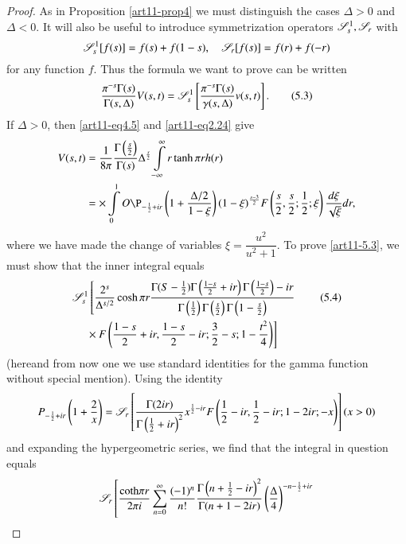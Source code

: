 \begin{proof}
As in Proposition \eqref{art11-prop4} we must distinguish the cases $\Delta > 0$ and $\Delta < 0$. It will also be useful  to introduce symmetrization operators $\mathscr{S}^1_s, \mathscr{S}_r$ with 
$$
\mathscr{S}^1_s [f(s)] = f(s) + f (1-s), \quad \mathscr{S}_r [f(s)] = f(r) + f (-r)
$$
for any function $f$. Thus the formula we want to prove can be written 
\begin{equation*}
\frac{\pi^{-s} \Gamma (s)}{\Gamma (s, \Delta)} V (s,t) = \mathscr{S}^1_s \left[\frac{\pi^{-s} \Gamma (s)}{\gamma (s, \Delta)} v (s,t) \right].
\tag{5.3}\label{art11-eq5.3}
\end{equation*}
If $\Delta >0$, then \eqref{art11-eq4.5} and \eqref{art11-eq2.24} give 
\begin{align*}
V(s,t) & =\frac{1}{8\pi} \frac{\Gamma \left(\frac{s}{2} \right)}{\Gamma (s)} \Delta^{\frac{s}{2}} \int\limits^\infty_{-\infty} r \tanh \pi r h (r)\\
& =\times \int\limits^1_0 O\P_{-\frac{1}{2} + ir} \left(1+ \frac{\Delta/ 2}{1-\xi} \right) (1-\xi)^{\frac{s-3}{2}} F \left(\frac{s}{2}, \frac{s}{2}; \frac{1}{2} ; \xi \right) \frac{d\xi}{\sqrt{\xi}} dr, 
\end{align*}
where we have made the change of variables $\xi =\dfrac{u^2}{u^2+1}$. To prove \eqref{art11-5.3}, we must show that the inner integral equals 
\begin{align*}
& \mathscr{S}^1_s \left[\frac{2^s}{\Delta^{s/2}} \cosh \pi r \frac{\Gamma (S-\frac{1}{2}) \Gamma \left(\frac{1-s}{2} + ir \right) \Gamma \left(\frac{1-s}{2}\right) -ir}{\Gamma \left(\frac{1}{2} \right) \Gamma \left(\frac{s}{2} \right) \Gamma \left(1-\frac{s}{2} \right)} \right.
\tag{5.4}\label{art11-eq5.4}\\
&\quad \left. {}\times F\left(\frac{1-s}{2} + i r, \frac{1-s}{2} - ir ; \frac{3}{2} - s ; 1 - \frac{t^2}{4} \right) \right]
\end{align*}
(here\pageoriginale and from now one we use standard identities for the gamma function without special mention). Using the identity 
{\fontsize{10}{12}\selectfont
$$
P_{-\frac{1}{2} + ir} \left(1+\frac{2}{x} \right) = \mathscr{S}_r 
\left[ \frac{\Gamma (2 ir)}{\Gamma \left(\frac{1}{2} + ir \right)^2} x^{\frac{1}{2} -ir} F \left(\frac{1}{2}  - ir ,\frac{1}{2}- ir; 1-2 ir; -x \right)\right] (x >0)
$$}\relax
[EH 3.2 (19)] and expanding the hypergeometric series, we find that the integral in question equals 
\begin{multline*}
\sS_r \left[\frac{\text{coth} \pi r}{2 \pi i} \sum\limits^\infty_{n=0} \frac{(-1)^n}{n!} \frac{\Gamma \left(n+ \frac{1}{2} - ir \right)^2}{\Gamma (n+1 - 2 i r)} \left(\frac{\Delta}{4} \right)^{-n -\frac{1}{2} + ir}  \right.\\

\end{multline*}
\end{proof}
